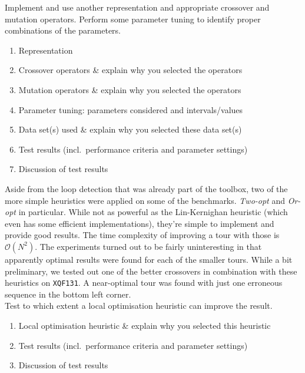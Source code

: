Implement and use another representation and appropriate crossover and mutation operators. Perform some parameter tuning to identify proper combinations of the parameters. 
\begin{enumerate}
\item	 Representation
\item Crossover operators \& explain why you selected the operators
\item Mutation operators \& explain why you selected the operators
\item Parameter tuning: parameters considered and intervals/values
\item Data set(s) used  \& explain why you selected these data set(s)
\item Test results (incl.\ performance criteria and parameter settings)
\item Discussion of test results

\end{enumerate}


Aside from the loop detection that was already part of the toolbox, two of the more simple heuristics were applied on some of the benchmarks. \textit{Two-opt} and \textit{Or-opt} in particular. While not as powerful as the Lin-Kernighan heuristic (which even has some efficient implementations), they're simple to implement and provide good results. The time complexity of improving a tour with those is $\mathcal{O}(N^2)$. The experiments turned out to be fairly uninteresting in that apparently optimal results were found for each of the smaller tours. While a bit preliminary, we tested out one of the better crossovers in combination with these heuristics on \texttt{XQF131}. A near-optimal tour was found with just one erroneous sequence in the bottom left corner.\\

Test to which extent a local optimisation heuristic can improve the result.
\begin{enumerate}
\item	Local optimisation heuristic \& explain why you selected this heuristic
\item Test results (incl.\ performance criteria and parameter settings)
\item Discussion of test results

\end{enumerate}


